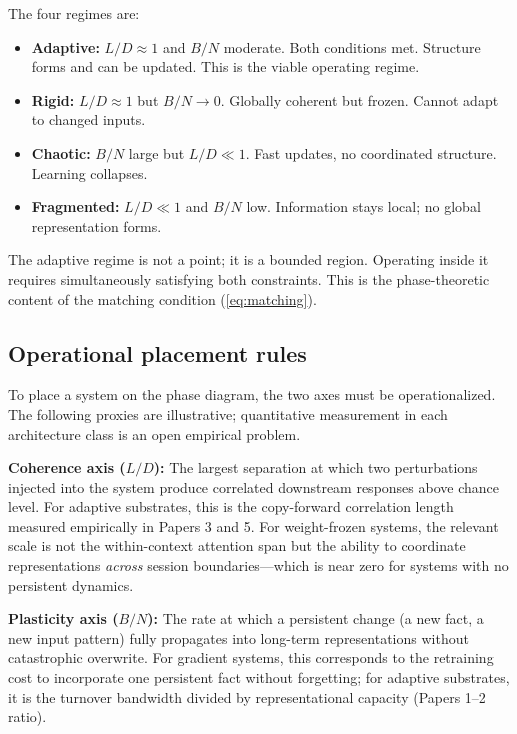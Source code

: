 \documentclass[12pt]{article}
\begin{document}
The four regimes are:
\begin{itemize}
  \item \textbf{Adaptive:} $L/D \approx 1$ and $B/N$ moderate. Both conditions met. Structure forms and can be updated. This is the viable operating regime.
  \item \textbf{Rigid:} $L/D \approx 1$ but $B/N \to 0$. Globally coherent but frozen. Cannot adapt to changed inputs.
  \item \textbf{Chaotic:} $B/N$ large but $L/D \ll 1$. Fast updates, no coordinated structure. Learning collapses.
  \item \textbf{Fragmented:} $L/D \ll 1$ and $B/N$ low. Information stays local; no global representation forms.
\end{itemize}

The adaptive regime is not a point; it is a bounded region. Operating inside it requires simultaneously satisfying both constraints. This is the phase-theoretic content of the matching condition (\ref{eq:matching}).

\subsection{Operational placement rules}

To place a system on the phase diagram, the two axes must be operationalized. The following proxies are illustrative; quantitative measurement in each architecture class is an open empirical problem.

\textbf{Coherence axis ($L/D$):} The largest separation at which two perturbations injected into the system produce correlated downstream responses above chance level. For adaptive substrates, this is the copy-forward correlation length measured empirically in Papers 3 and 5. For weight-frozen systems, the relevant scale is not the within-context attention span but the ability to coordinate representations \emph{across} session boundaries---which is near zero for systems with no persistent dynamics.

\textbf{Plasticity axis ($B/N$):} The rate at which a persistent change (a new fact, a new input pattern) fully propagates into long-term representations without catastrophic overwrite. For gradient systems, this corresponds to the retraining cost to incorporate one persistent fact without forgetting; for adaptive substrates, it is the turnover bandwidth divided by representational capacity (Papers 1--2 ratio).
\end{document}
